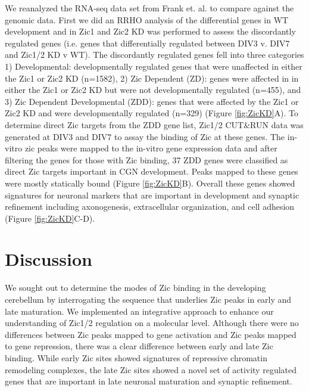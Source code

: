 \documentclass[fleqn,10pt]{wlscirep}
\begin{document}

We reanalyzed the RNA-seq data set from Frank et. al. \cite{Frank2015RegulationCerebellum} to compare against the genomic data. First we did an RRHO analysis of the differential genes in WT development and in Zic1 and Zic2 KD was performed to assess the discordantly regulated genes (i.e. genes that differentially regulated between DIV3 v. DIV7 and Zic1/2 KD v WT). The discordantly regulated genes fell into three categories 1) Developmental: developmentally regulated genes that were unaffected in either the Zic1 or Zic2 KD (n=1582), 2) Zic Dependent (ZD): genes were affected in in either the Zic1 or Zic2 KD but were not developmentally regulated (n=455), and 3) Zic Dependent Developmental (ZDD): genes that were affected by the Zic1 or Zic2 KD and were developmentally regulated (n=329) (Figure \ref{fig:ZicKD}A). To determine direct Zic targets from the ZDD gene list, Zic1/2 CUT&RUN data was generated at DIV3 and DIV7 to assay the binding of Zic at these genes. The in-vitro zic peaks were mapped to the in-vitro gene expression data and  after filtering the genes for those with Zic binding, 37 ZDD genes were classified as direct Zic targets important in CGN development. Peaks mapped to these genes were mostly statically bound (Figure \ref{fig:ZicKD}B). Overall these genes showed signatures for neuronal markers that are important in development and synaptic refinement including axonogenesis, extracellular organization, and cell adhesion (Figure \ref{fig:ZicKD}C-D). 

\section*{Discussion}
We sought out to determine the modes of Zic binding in the developing cerebellum by interrogating the sequence that underlies Zic peaks in early and late maturation. We implemented an integrative approach to enhance our understanding of Zic1/2 regulation on a molecular level. Although there were no differences between Zic peaks mapped to gene activation and Zic peaks mapped to gene repression, there was a clear difference between early and late Zic binding. While early Zic sites showed signatures of repressive chromatin remodeling complexes, the late Zic sites showed a novel set of activity regulated genes that are important in late neuronal maturation and synaptic refinement. 
\end{document}
